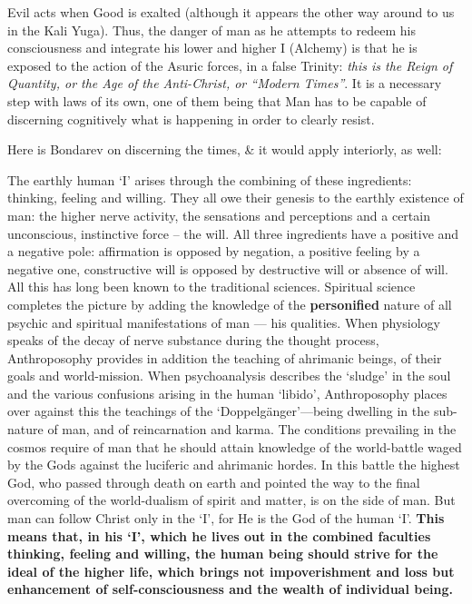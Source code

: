 \begin{quotationx}
Evil acts when Good is exalted (although it appears the other way around to us in the Kali Yuga). Thus, the danger of man as he attempts to redeem his consciousness and integrate his lower and higher I (Alchemy) is that he is exposed to the action of the Asuric forces, in a false Trinity: \emph{this is the Reign of Quantity, or the Age of the Anti-Christ, or ``Modern Times''}. It is a necessary step with laws of its own, one of them being that Man has to be capable of discerning cognitively what is happening in order to clearly resist.
\end{quotationx}

Here is Bondarev on discerning the times, \& it would apply interiorly, as well:

\begin{quotex}
The earthly human `I' arises through the combining of these ingredients: thinking, feeling and willing. They all owe their genesis to the earthly existence of man: the higher nerve activity, the sensations and perceptions and a certain unconscious, instinctive force -- the will. All three ingredients have a positive and a negative pole: affirmation is opposed by negation, a positive feeling by a negative one, constructive will is opposed by destructive will or absence of will. All this has long been known to the traditional sciences. Spiritual science completes the picture by adding the knowledge of the \textbf{personified} nature of all psychic and spiritual manifestations of man --- his qualities. When physiology speaks of the decay of nerve substance during the thought process, Anthroposophy provides in addition the teaching of ahrimanic beings, of their goals and world-mission. When psychoanalysis describes the `sludge' in the soul and the various confusions arising in the human `libido', Anthroposophy places over against this the teachings of the `Doppelgänger'---being dwelling in the sub-nature of man, and of reincarnation and karma. The conditions prevailing in the cosmos require of man that he should attain knowledge of the world-battle waged by the Gods against the luciferic and ahrimanic hordes. In this battle the highest God, who passed through death on earth and pointed the way to the final overcoming of the world-dualism of spirit and matter, is on the side of man. But man can follow Christ only in the `I', for He is the God of the human `I'. \textbf{This means that, in his `I', which he lives out in the combined faculties thinking, feeling and willing, the human being should strive for the ideal of the higher life, which brings not impoverishment and loss but enhancement of self-consciousness and the wealth of individual being.}
\end{quotex}

